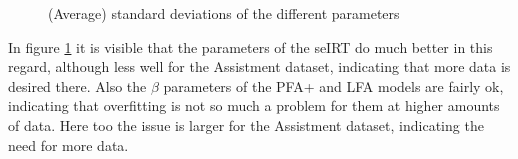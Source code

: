 \documentclass{scrartcl}
\begin{document}
\begin{figure}[!htbp]
\centering
{}
\hspace{0mm}
\caption{(Average) standard deviations of the different parameters}
\label{fig:parvarz}
\end{figure}
In figure \ref{fig:parvarz} it is visible that the parameters of the seIRT do much better in this regard, although less well for the Assistment dataset, indicating that more data is desired there. Also the $\beta$ parameters of the PFA+ and LFA models are fairly ok, indicating that overfitting is not so much a problem for them at higher amounts of data. Here too the issue is larger for the Assistment dataset, indicating the need for more data.
\end{document}
